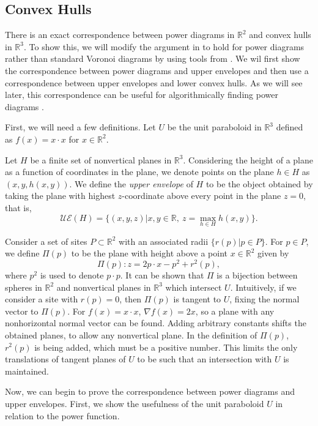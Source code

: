 \documentclass[a4paper, 11pt]{article}
\newcommand{\R}{\mathbb{R}}
\begin{document}
\subsection{Convex Hulls}

There is an exact correspondence between power diagrams in $\R^2$ and convex hulls in $\R^3$. To show this, we will modify the argument in
\cite{comp_geom} to hold for power diagrams rather than standard Voronoi diagrams by using tools from \cite{aurenhammer_power}. We wil first show the correspondence between power diagrams and
upper envelopes and then use a correspondence between upper envelopes and lower convex hulls. As we will see later, this correspondence can be useful
for algorithmically finding power diagrams \cite{aurenhammer_power}.

First, we will need a few definitions. Let $U$ be the unit paraboloid in $\R^3$ defined as $f(x) = x \cdot x$ for $x \in \R^2$.

Let $H$ be a finite set of nonvertical planes in $\R^3$. Considering the height of a plane as a function of coordinates in the plane, we denote points
on the plane $h \in H$ as $(x,y,h(x,y))$. We define the \textit{upper envelope} of $H$ to be the object obtained by taking the plane with highest
$z$-coordinate above every point in the plane $z = 0$, that is,
\[ \mathcal{UE}(H) = \{ (x,y,z) | x,y \in \R, \ z = \max_{h \in H} h(x,y) \} .\]

Consider a set of sites $P \subset \R^2$ with an associated radii $\{r(p) | p \in P\}$. For $p \in P$, we define $\Pi(p)$ to be the plane with height above a point
$x \in \R^2$ given by
\[ \Pi(p) : z = 2 p \cdot x - p^2 + r^2(p) ,\]
where $p^2$ is used to denote $p \cdot p$. It can be shown that $\Pi$ is a bijection between spheres in $\R^2$ and nonvertical planes in $\R^3$ which
intersect $U$. Intuitively, if we consider a site with $r(p) = 0$, then $\Pi(p)$ is tangent to $U$, fixing the normal vector to $\Pi(p)$. For $f(x) =
x \cdot x$, $\nabla f(x) = 2x$, so a plane with any nonhorizontal normal vector can be found. Adding arbitrary constants shifts the obtained planes, to allow any
nonvertical plane. In the definition of $\Pi(p)$, $r^2(p)$ is being added, which must be a positive number. This limits the only translations of
tangent planes of $U$ to be such that an intersection with $U$ is maintained.

Now, we can begin to prove the correspondence between power diagrams and upper envelopes. First, we show the usefulness of the unit paraboloid $U$ in
relation to the power function.
\end{document}

